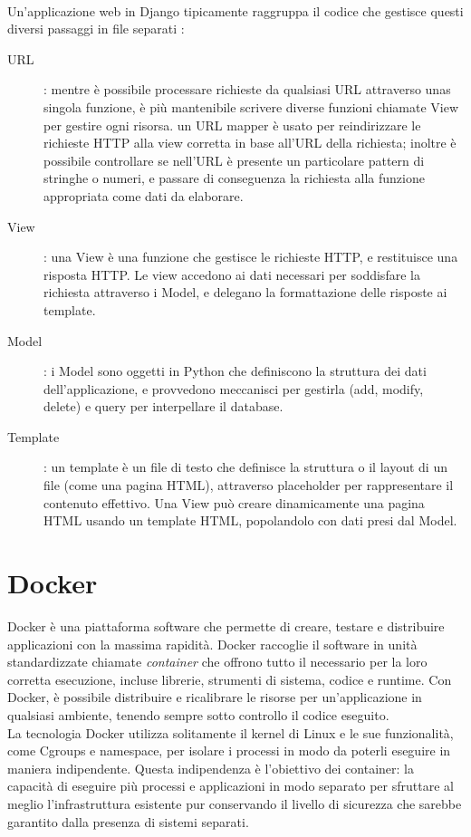 \ \\
Un'applicazione web in Django tipicamente raggruppa il codice che gestisce questi diversi passaggi in file separati \cite{mdn-django-documentation}:
\begin{description}
	\item[URL]: mentre è possibile processare richieste da qualsiasi URL attraverso unas singola funzione, è più mantenibile scrivere diverse funzioni chiamate
	View per gestire ogni risorsa. un URL mapper è usato per reindirizzare le richieste HTTP alla view corretta in base all'URL della richiesta; inoltre è 
	possibile controllare se nell'URL è presente un particolare pattern di stringhe o numeri, e passare di conseguenza la richiesta alla funzione appropriata
	come dati da elaborare.
	\item[View]: una View è una funzione che gestisce le richieste HTTP, e restituisce una risposta HTTP. Le view accedono ai dati necessari per soddisfare la 
	richiesta attraverso i Model, e delegano la formattazione delle risposte ai template. 
	\item[Model]: i Model sono oggetti in Python che definiscono la struttura dei dati dell'applicazione, e provvedono meccanisci per gestirla (add, modify, 
	delete) e query per interpellare il database.
	\item[Template]: un template è un file di testo che definisce la struttura o il layout di un file (come una pagina HTML), attraverso placeholder per 
	rappresentare il contenuto effettivo. Una View può creare dinamicamente una pagina HTML usando un template HTML, popolandolo con dati presi dal Model. 
\end{description}

\section{Docker}
Docker è una piattaforma software che permette di creare, testare e distribuire applicazioni con la massima rapidità. Docker raccoglie 
il software in unità standardizzate chiamate \textit{container} che offrono tutto il necessario per la loro corretta esecuzione, incluse librerie, 
strumenti di sistema, codice e runtime. Con Docker, è possibile distribuire e ricalibrare le risorse per un'applicazione in qualsiasi ambiente, 
tenendo sempre sotto controllo il codice eseguito.\\
La tecnologia Docker utilizza solitamente il kernel di Linux e le sue funzionalità, come Cgroups e namespace, per isolare i processi in modo da poterli 
eseguire in maniera indipendente. Questa indipendenza è l'obiettivo dei container: la capacità di eseguire più processi e applicazioni in 
modo separato per sfruttare al meglio l'infrastruttura esistente pur conservando il livello di sicurezza che sarebbe garantito dalla 
presenza di sistemi separati.

